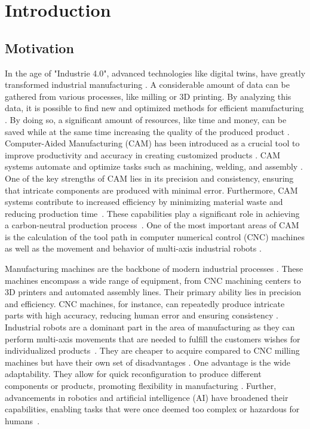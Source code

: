 \chapter{Introduction}%

\section{Motivation}%

In the age of "Industrie 4.0", advanced technologies like digital twins, have greatly transformed industrial manufacturing \cite{Singh.2021}. A considerable amount of data can be gathered from various processes, like milling or 3D printing. By analyzing this data, it is possible to find new and optimized methods for efficient manufacturing \cite{Ghobakhloo.2020}. By doing so, a significant amount of resources, like time and money, can be saved while at the same time increasing the quality of the produced product \cite{Bibby.2018,Simonis.2016}.\newline
Computer-Aided Manufacturing (CAM) has been introduced as a crucial tool to improve productivity and accuracy in creating customized products \cite{Feldhausen.2022}. CAM systems automate and optimize tasks such as machining, welding, and assembly \cite{LalitNarayan.2013b}. One of the key strengths of CAM lies in its precision and consistency, ensuring that intricate components are produced with minimal error. Furthermore, CAM systems contribute to increased efficiency by minimizing material waste and reducing production time~\cite{Dubovska.2014}. These capabilities play a significant role in achieving a carbon-neutral production process~\cite{Saxena.2020}. One of the most important areas of CAM is the calculation of the tool path in computer numerical control (CNC) machines as well as the movement and behavior of multi-axis industrial robots \cite{Pan}. \newline


Manufacturing machines are the backbone of modern industrial processes \cite{Bi.2020}. These machines encompass a wide range of equipment, from CNC machining centers to 3D printers and automated assembly lines. Their primary ability lies in precision and efficiency. CNC machines, for instance, can repeatedly produce intricate parts with high accuracy, reducing human error and ensuring consistency \cite{Jia.2018}. \newline
Industrial robots are a dominant part in the area of manufacturing as they can perform multi-axis movements that are needed to fulfill the customers wishes for individualized products~\cite{Sherwani.2020}. They are cheaper to acquire compared to CNC milling machines but have their own set of disadvantages \cite{Iglesias.2015}. One advantage is the wide adaptability. They allow for quick reconfiguration to produce different components or products, promoting flexibility in manufacturing \cite{Billard.2019}. Further, advancements in robotics and artificial intelligence (AI) have broadened their capabilities, enabling tasks that were once deemed too complex or hazardous for humans~\cite{Goel.2020}. \newline

